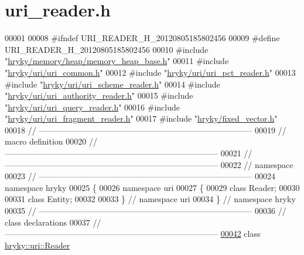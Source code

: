 \hypertarget{uri__reader_8h_source}{\section{uri\-\_\-reader.\-h}
}

\begin{DoxyCode}
00001 
00008 \textcolor{preprocessor}{#ifndef URI\_READER\_H\_20120805185802456}
00009 \textcolor{preprocessor}{}\textcolor{preprocessor}{#define URI\_READER\_H\_20120805185802456}
00010 \textcolor{preprocessor}{}\textcolor{preprocessor}{#include "\hyperlink{memory__heap__base_8h}{hryky/memory/heap/memory_heap_base.h}"}
00011 \textcolor{preprocessor}{#include "\hyperlink{uri__common_8h}{hryky/uri/uri_common.h}"}
00012 \textcolor{preprocessor}{#include "\hyperlink{uri__pct__reader_8h}{hryky/uri/uri_pct_reader.h}"}
00013 \textcolor{preprocessor}{#include "\hyperlink{uri__scheme__reader_8h}{hryky/uri/uri_scheme_reader.h}"}
00014 \textcolor{preprocessor}{#include "\hyperlink{uri__authority__reader_8h}{hryky/uri/uri_authority_reader.h}"}
00015 \textcolor{preprocessor}{#include "\hyperlink{uri__query__reader_8h}{hryky/uri/uri_query_reader.h}"}
00016 \textcolor{preprocessor}{#include "\hyperlink{uri__fragment__reader_8h}{hryky/uri/uri_fragment_reader.h}"}
00017 \textcolor{preprocessor}{#include "\hyperlink{fixed__vector_8h}{hryky/fixed_vector.h}"}
00018 \textcolor{comment}{//
      ------------------------------------------------------------------------------}
00019 \textcolor{comment}{// macro definition}
00020 \textcolor{comment}{//
      ------------------------------------------------------------------------------}
00021 \textcolor{comment}{//
      ------------------------------------------------------------------------------}
00022 \textcolor{comment}{// namespace}
00023 \textcolor{comment}{//
      ------------------------------------------------------------------------------}
00024 \textcolor{keyword}{namespace }hryky
00025 \{
00026 \textcolor{keyword}{namespace }uri
00027 \{
00029     \textcolor{keyword}{class }Reader;
00030 
00031     \textcolor{keyword}{class }Entity;
00032 
00033 \} \textcolor{comment}{// namespace uri}
00034 \} \textcolor{comment}{// namespace hryky}
00035 \textcolor{comment}{//
      ------------------------------------------------------------------------------}
00036 \textcolor{comment}{// class declarations}
00037 \textcolor{comment}{//
      ------------------------------------------------------------------------------}
\hypertarget{uri__reader_8h_source_l00042}{}\hyperlink{classhryky_1_1uri_1_1_reader}{00042} \textcolor{comment}{}\textcolor{keyword}{class }\hyperlink{classhryky_1_1uri_1_1_reader}{hryky::uri::Reader}

\end{DoxyCode}
